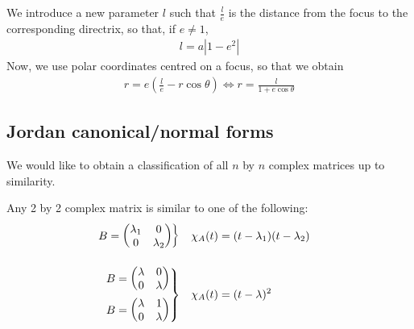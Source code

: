 \documentclass{../template/note}
\begin{document}
    We introduce a new parameter \(l\) such that \(\frac l e\) is the distance from the focus to the corresponding directrix, so that, if \(e \neq 1\),
    \begin{align*}
        l = a|1-e^2|
    \end{align*}
    Now, we use polar coordinates centred on a focus, so that we obtain
    \begin{align*}
        r = e\left(\frac l e -r\cos \theta\right) \iff r = \frac l{1+e \cos \theta}
    \end{align*}
    
    \subsection{Jordan canonical/normal forms}

    We would like to obtain a classification of all \(n\) by \(n\) complex matrices up to similarity.   

    \begin{proposition}
        Any 2 by 2 complex matrix is similar to one of the following:
        \begin{align*}
            \begin{rcases}
                B = \begin{pmatrix}
                    \lambda_1 & 0 \\
                    0 & \lambda_2 \\
                \end{pmatrix}
            \end{rcases} && \chi_A(t) &= (t-\lambda_1)(t-\lambda_2) \\[10pt]
            \begin{rcases}
                B = \begin{pmatrix}
                    \lambda & 0 \\
                    0 & \lambda \\
                \end{pmatrix} \\
                B = \begin{pmatrix}
                    \lambda & 1 \\
                    0 & \lambda \\
                \end{pmatrix}
            \end{rcases} && \chi_A(t) &= (t-\lambda)^2
        \end{align*}
    \end{proposition}
    
\end{document}
